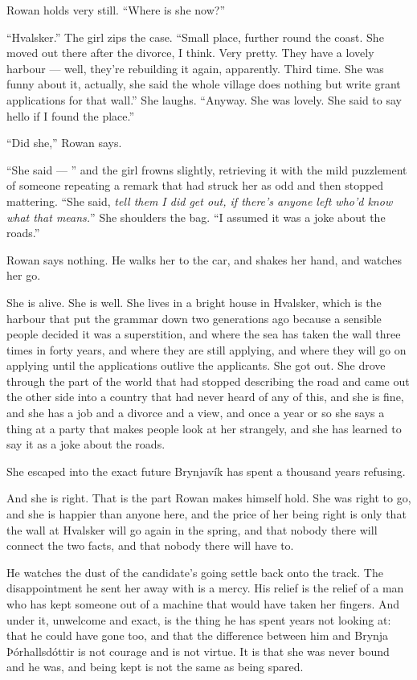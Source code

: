 \documentclass[11pt,oneside]{book}
\begin{document}
Rowan holds very still. ``Where is she now?''

``Hvalsker.'' The girl zips the case. ``Small place, further round the
coast. She moved out there after the divorce, I think. Very pretty. They
have a lovely harbour --- well, they're rebuilding it again, apparently.
Third time. She was funny about it, actually, she said the whole village
does nothing but write grant applications for that wall.'' She laughs.
``Anyway. She was lovely. She said to say hello if I found the place.''

``Did she,'' Rowan says.

``She said --- '' and the girl frowns slightly, retrieving it with the
mild puzzlement of someone repeating a remark that had struck her as odd
and then stopped mattering. ``She said, \emph{tell them I did get out,
if there's anyone left who'd know what that means.}'' She shoulders the
bag. ``I assumed it was a joke about the roads.''

Rowan says nothing. He walks her to the car, and shakes her hand, and
watches her go.

She is alive. She is well. She lives in a bright house in Hvalsker,
which is the harbour that put the grammar down two generations ago
because a sensible people decided it was a superstition, and where the
sea has taken the wall three times in forty years, and where they are
still applying, and where they will go on applying until the
applications outlive the applicants. She got out. She drove through the
part of the world that had stopped describing the road and came out the
other side into a country that had never heard of any of this, and she
is fine, and she has a job and a divorce and a view, and once a year or
so she says a thing at a party that makes people look at her strangely,
and she has learned to say it as a joke about the roads.

She escaped into the exact future Brynjavík has spent a thousand years
refusing.

And she is right. That is the part Rowan makes himself hold. She was
right to go, and she is happier than anyone here, and the price of her
being right is only that the wall at Hvalsker will go again in the
spring, and that nobody there will connect the two facts, and that
nobody there will have to.

He watches the dust of the candidate's going settle back onto the track.
The disappointment he sent her away with is a mercy. His relief is the
relief of a man who has kept someone out of a machine that would have
taken her fingers. And under it, unwelcome and exact, is the thing he
has spent years not looking at: that he could have gone too, and that
the difference between him and Brynja Þórhallsdóttir is not courage and
is not virtue. It is that she was never bound and he was, and being kept
is not the same as being spared.
\end{document}
